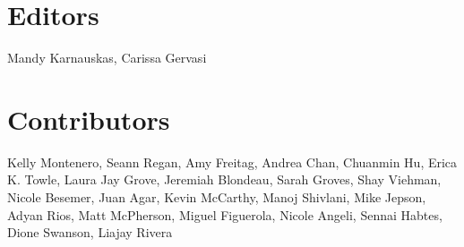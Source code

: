 \documentclass[
  letterpaper,
  oneside,
  open=any]{scrbook}
\begin{document}
\section{\texorpdfstring{\textbf{Editors}}{Editors}}\label{editors}

Mandy Karnauskas, Carissa Gervasi

\section{\texorpdfstring{\textbf{Contributors}}{Contributors}}\label{contributors-1}

Kelly Montenero, Seann Regan, Amy Freitag, Andrea Chan, Chuanmin Hu,
Erica K. Towle, Laura Jay Grove, Jeremiah Blondeau, Sarah Groves, Shay
Viehman, Nicole Besemer, Juan Agar, Kevin McCarthy, Manoj Shivlani, Mike
Jepson, Adyan Rios, Matt McPherson, Miguel Figuerola, Nicole Angeli,
Sennai Habtes, Dione Swanson, Liajay Rivera


\backmatter
\end{document}
